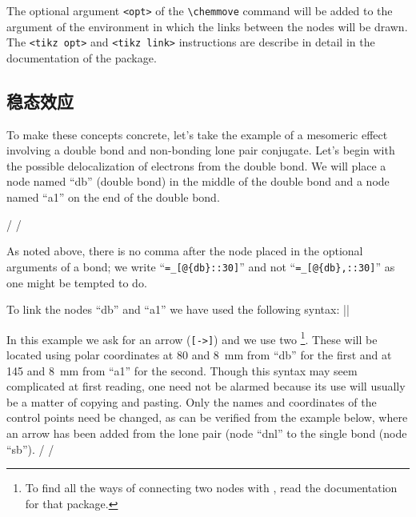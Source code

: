 \documentclass[10pt]{article}
\begin{document}
The optional argument \verb-<opt>- of the \verb-\chemmove- command will be added to the argument of the  environment in which the links between the nodes will be drawn. The \verb-<tikz opt>- and \verb-<tikz link>- instructions are describe in detail in the documentation of the \TIKZ package.

\subsection{稳态效应}
To make these concepts concrete, let's take the example of a mesomeric effect involving a double bond and non-bonding lone pair conjugate. Let's begin with the possible delocalization of electrons from the double bond. We will place a node named ``db'' (double bond) in the middle of the double bond and a node named ``a1'' on the end of the double bond.

/
\chemrel{<->}
/

As noted above, there is no comma after the node placed in the optional arguments of a bond; we write ``\verb|=_[@{db}::30]|'' and not ``\verb|=_[@{db},::30]|'' as one might be tempted to do.

To link the nodes ``db'' and ``a1'' we have used the following syntax:
\centerverb||
\medskip

In this example we ask for an arrow (\verb/[->]/) and we use two \footnote{To find all the ways of connecting two nodes with \TIKZ, read the documentation for that package.}. These will be located using polar coordinates at 80\degres{} and 8~mm from ``db'' for the first and at 145\degres{} and 8~mm from ``a1'' for the second. Though this syntax may seem complicated at first reading, one need not be alarmed because its use will usually be a matter of copying and pasting. Only the names and coordinates of the control points need be changed, as can be verified from the example below, where an arrow has been added from the lone pair (node ``dnl'' to the single bond (node ``sb'').
/
\chemrel{<->}
/
\end{document}
